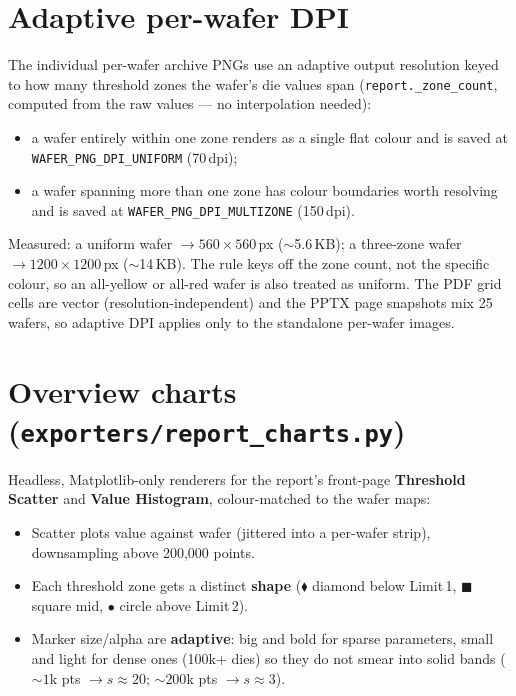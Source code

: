 \documentclass[11pt,a4paper]{report}
\newcommand{\code}[1]{\texttt{#1}}
\begin{document}
\section{Adaptive per-wafer DPI}
The individual per-wafer archive PNGs use an adaptive output resolution keyed to
how many threshold zones the wafer's die values span (\code{report.\_zone\_count},
computed from the raw values --- no interpolation needed):
\begin{itemize}[leftmargin=1.4em]
  \item a wafer entirely within one zone renders as a single flat colour and is
        saved at \code{WAFER\_PNG\_DPI\_UNIFORM} (70\,dpi);
  \item a wafer spanning more than one zone has colour boundaries worth resolving
        and is saved at \code{WAFER\_PNG\_DPI\_MULTIZONE} (150\,dpi).
\end{itemize}
Measured: a uniform wafer $\to 560\times560$\,px ($\sim$5.6\,KB); a three-zone
wafer $\to 1200\times1200$\,px ($\sim$14\,KB). The rule keys off the zone count,
not the specific colour, so an all-yellow or all-red wafer is also treated as
uniform. The PDF grid cells are vector (resolution-independent) and the PPTX page
snapshots mix 25 wafers, so adaptive DPI applies only to the standalone
per-wafer images.

\section{Overview charts (\code{exporters/report\_charts.py})}
Headless, Matplotlib-only renderers for the report's front-page \textbf{Threshold
Scatter} and \textbf{Value Histogram}, colour-matched to the wafer maps:
\begin{itemize}[leftmargin=1.4em]
  \item Scatter plots value against wafer (jittered into a per-wafer strip),
        downsampling above 200{,}000 points.
  \item Each threshold zone gets a distinct \textbf{shape}
        (\textcolor{zred}{$\blacklozenge$ diamond} below Limit\,1,
        \textcolor{zamber}{$\blacksquare$ square} mid,
        \textcolor{zgreen}{$\bullet$ circle} above Limit\,2).
  \item Marker size/alpha are \textbf{adaptive}: big and bold for sparse
        parameters, small and light for dense ones (100k+ dies) so they do not
        smear into solid bands ($\sim1$k pts $\to s\approx20$; $\sim200$k pts
        $\to s\approx3$).
\end{itemize}
\end{document}
